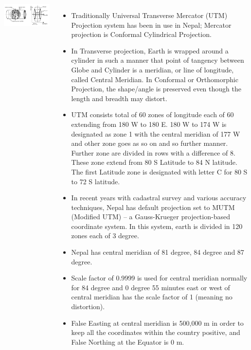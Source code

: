 \documentclass[11pt,dvipsnames,ignorenonframetext,aspectratio=169]{beamer}
\begin{document}
\begin{frame}{}
\protect\hypertarget{section-4}{}
\begin{columns}[T, onlytextwidth]


\includegraphics[width=0.99\linewidth]{../images/UTM_projection} 


\begin{itemize}
\scriptsize
\item Traditionally Universal Transverse Mercator (UTM) Projection system has been in use in Nepal; Mercator projection is Conformal Cylindrical Projection.
\item In Transverse projection, Earth is wrapped around a cylinder in such a manner that point of tangency between Globe and Cylinder is a meridian, or line of longitude, called Central Meridian. In Conformal or Orthomorphic Projection, the shape/angle is preserved even though the length and breadth may distort.
\item UTM consists total of 60 zones of longitude each of 60 extending from 180 W to 180 E. 180 W to 174 W is designated as zone 1 with the central meridian of 177 W and other zone goes as so on and so further manner. Further zone are divided in rows with a difference of 8. These zone extend from 80 S Latitude to 84 N latitude. The first Latitude zone is designated with letter C for 80 S to 72 S latitude.
\item In recent years with cadastral survey and various accuracy techniques, Nepal has default projection set to MUTM (Modified UTM) -- a Gauss-Krueger projection-based coordinate system. In this system, earth is divided in 120 zones each of 3 degree.
\item Nepal has central meridian of 81 degree, 84 degree and 87 degree.
\item Scale factor of 0.9999 is used for central meridian normally for 84 degree and 0 degree 55 minutes east or west of central meridian has the scale factor of 1 (meaning no distortion).
\item False Easting at central meridian is 500,000 m in order to keep all the coordinates within the country positive, and False Northing at the Equator is 0 m.
\end{itemize}
\end{columns}
\end{frame}
\end{document}
